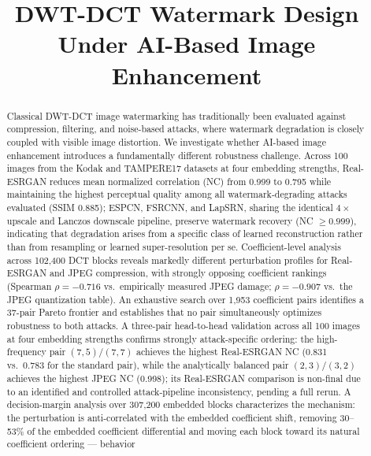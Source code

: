\documentclass[conference]{IEEEtran}
\begin{document}
\title{DWT-DCT Watermark Design Under AI-Based Image Enhancement}

\author{
}

\maketitle

\begin{abstract}
Classical DWT-DCT image watermarking has traditionally been evaluated
against compression, filtering, and noise-based attacks, where watermark
degradation is closely coupled with visible image distortion. We
investigate whether AI-based image enhancement introduces a fundamentally
different robustness challenge. Across 100 images from the Kodak and
TAMPERE17 datasets at four embedding strengths, Real-ESRGAN reduces mean
normalized correlation (NC) from 0.999 to 0.795 while maintaining the
highest perceptual quality among all watermark-degrading attacks
evaluated (SSIM 0.885);
ESPCN, FSRCNN, and LapSRN, sharing the identical $4\times$ upscale and
Lanczos downscale pipeline, preserve watermark recovery
(NC $\geq 0.999$), indicating that degradation arises from a specific
class of learned reconstruction rather than from resampling or learned
super-resolution per se. Coefficient-level analysis across 102,400 DCT blocks reveals
markedly different perturbation profiles for Real-ESRGAN and JPEG
compression, with strongly opposing coefficient rankings (Spearman
$\rho = -0.716$ vs.\ empirically measured JPEG damage; $\rho = -0.907$
vs.\ the JPEG quantization table). An exhaustive search over 1,953
coefficient pairs identifies a 37-pair Pareto frontier and establishes
that no pair simultaneously optimizes robustness to both attacks. A
three-pair head-to-head validation across all 100 images at four
embedding strengths confirms strongly attack-specific ordering: the
high-frequency pair $(7,5)/(7,7)$ achieves the highest Real-ESRGAN NC
(0.831 vs.\ 0.783 for the standard pair), while the analytically
balanced pair $(2,3)/(3,2)$ achieves the highest JPEG NC (0.998); its
Real-ESRGAN comparison is non-final due to an identified and controlled
attack-pipeline inconsistency, pending a full rerun. A decision-margin
analysis over 307,200 embedded blocks characterizes the mechanism: the
perturbation is anti-correlated with the embedded coefficient shift,
removing 30--53\% of the embedded coefficient differential and moving
each block toward its natural coefficient ordering --- behavior

\end{abstract}
\end{document}
